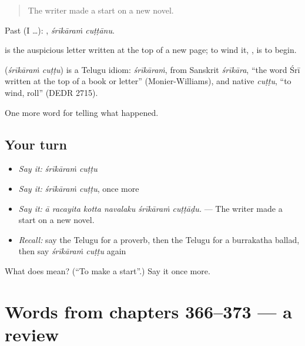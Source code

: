 \begin{quote}
The writer made a start on a new novel.
\end{quote}

Past (I …):  , \emph{śrīkāraṁ cuṭṭānu}.

 is the auspicious letter  written at the top of a new page; to wind it, , is to begin.

\begin{cousinweb}
\textbf{ } (\emph{śrīkāraṁ cuṭṭu}) is a Telugu idiom: \emph{śrīkāraṁ}, from Sanskrit \emph{śrīkāra}, \textquotedblleft{}the word Śrī written at the top of a book or letter\textquotedblright{} (Monier-Williams), and native \emph{cuṭṭu}, \textquotedblleft{}to wind, roll\textquotedblright{} (DEDR 2715).
\end{cousinweb}

\begin{grammarlens}[title={What you've built}]
One more word for telling what happened.
\end{grammarlens}

\subsection*{Your turn}
\begin{itemize}
\raggedright
  \item \emph{Say it:} \emph{śrīkāraṁ cuṭṭu}
  \item \emph{Say it:} \emph{śrīkāraṁ cuṭṭu}, once more
  \item \emph{Say it:} \emph{ā racayita kotta navalaku śrīkāraṁ cuṭṭāḍu.} — The writer made a start on a new novel.
  \item \emph{Recall:} say the Telugu for a proverb, then the Telugu for a burrakatha ballad, then say \emph{śrīkāraṁ cuṭṭu} again
\end{itemize}

\begin{tcolorbox}[breakable,colback=teal!4,colframe=teal!35!black,title={Before you move on}]
What does   mean? (\textquotedblleft{}To make a start\textquotedblright{}.) Say it once more.
\end{tcolorbox}
\section[(dialogue)]{Words from chapters 366–373 — a review}

\label{lesson:TE-R373-review-366-373}



